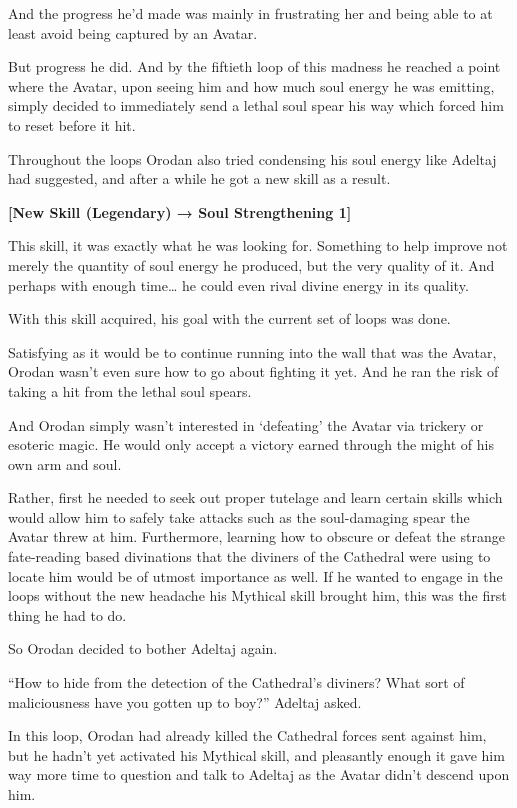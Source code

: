 \documentclass[a4paper,10pt]{book}
\begin{document}
And the progress he’d made was mainly in frustrating her and being able to at least avoid being captured by an Avatar.\par
But progress he did. And by the fiftieth loop of this madness he reached a point where the Avatar, upon seeing him and how much soul energy he was emitting, simply decided to immediately send a lethal soul spear his way which forced him to reset before it hit.\par
Throughout the loops Orodan also tried condensing his soul energy like Adeltaj had suggested, and after a while he got a new skill as a result.\par
\textbf{[New Skill (Legendary) → Soul Strengthening 1]}\par
This skill, it was exactly what he was looking for. Something to help improve not merely the quantity of soul energy he produced, but the very quality of it. And perhaps with enough time… he could even rival divine energy in its quality.\par
With this skill acquired, his goal with the current set of loops was done.\par
Satisfying as it would be to continue running into the wall that was the Avatar, Orodan wasn’t even sure how to go about fighting it yet. And he ran the risk of taking a hit from the lethal soul spears.\par
And Orodan simply wasn’t interested in ‘defeating’ the Avatar via trickery or esoteric magic. He would only accept a victory earned through the might of his own arm and soul.\par
Rather, first he needed to seek out proper tutelage and learn certain skills which would allow him to safely take attacks such as the soul-damaging spear the Avatar threw at him. Furthermore, learning how to obscure or defeat the strange fate-reading based divinations that the diviners of the Cathedral were using to locate him would be of utmost importance as well. If he wanted to engage in the loops without the new headache his Mythical skill brought him, this was the first thing he had to do.\par
So Orodan decided to bother Adeltaj again.\par
\par
“How to hide from the detection of the Cathedral’s diviners? What sort of maliciousness have you gotten up to boy?” Adeltaj asked.\par
In this loop, Orodan had already killed the Cathedral forces sent against him, but he hadn’t yet activated his Mythical skill, and pleasantly enough it gave him way more time to question and talk to Adeltaj as the Avatar didn’t descend upon him.\par
\end{document}
